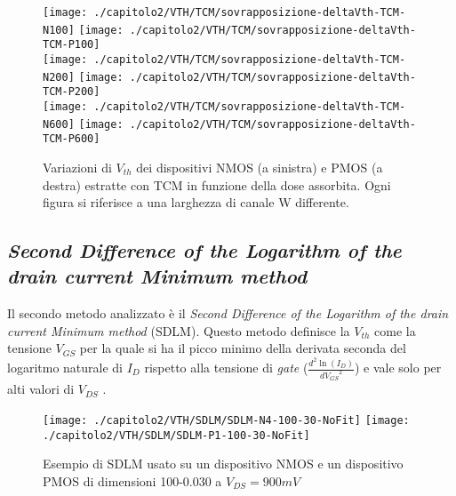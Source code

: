 \vfill

\clearpage
\begin{figure}[ht]
  \centering
  \texttt{[image: ./capitolo2/VTH/TCM/sovrapposizione-deltaVth-TCM-N100]}
  \texttt{[image: ./capitolo2/VTH/TCM/sovrapposizione-deltaVth-TCM-P100]}\\
  \vspace{0.2cm}
  \texttt{[image: ./capitolo2/VTH/TCM/sovrapposizione-deltaVth-TCM-N200]}
  \texttt{[image: ./capitolo2/VTH/TCM/sovrapposizione-deltaVth-TCM-P200]}\\
  \vspace{0.2cm}
  \texttt{[image: ./capitolo2/VTH/TCM/sovrapposizione-deltaVth-TCM-N600]}
  \texttt{[image: ./capitolo2/VTH/TCM/sovrapposizione-deltaVth-TCM-P600]}

  \caption[Dati $\Delta V_{th}$ estratti con TCM]{Variazioni di $V_{th}$ dei dispositivi NMOS (a sinistra) e PMOS (a destra) estratte con TCM in funzione della dose assorbita. Ogni figura si riferisce a una larghezza di canale W differente.}
  \label{fig:deltaVthTCM}
\end{figure}

\FloatBarrier

\subsection[SDLM]{\emph{Second Difference of the Logarithm of the drain current Minimum method}}
Il secondo metodo analizzato è il \emph{Second Difference of the Logarithm of the drain current Minimum method} (SDLM). Questo metodo definisce la $V_{th}$ come la tensione $V_{GS}$ per la quale si ha il picco minimo della derivata seconda del logaritmo naturale di $I_D$ rispetto alla tensione di \emph{gate} ($\frac{d^2\ln(I_D)}{d{V_{GS}}^2}$) e vale solo per alti valori di $V_{DS}$ \cite{art1}.


\begin{figure}[ht]
  \centering
  \texttt{[image: ./capitolo2/VTH/SDLM/SDLM-N4-100-30-NoFit]}
  \texttt{[image: ./capitolo2/VTH/SDLM/SDLM-P1-100-30-NoFit]}
  \caption[Applicazione SDLM senza fit polinomiale]{Esempio di SDLM usato su un dispositivo NMOS e un dispositivo PMOS di dimensioni 100-0.030 a $V_{DS} = 900 mV$}
  \label{fig:SDLM_NO_FIT}
\end{figure}

